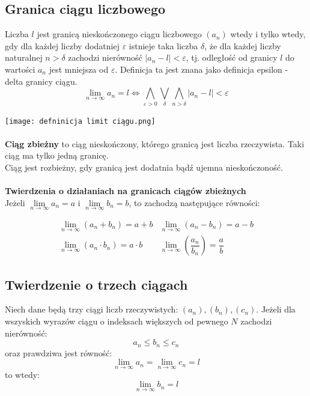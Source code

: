 \documentclass[14pt,a4paper]{extarticle}
\begin{document}
\subsection{Granica ciągu liczbowego}
Liczba $l$ jest granicą nieskończonego ciągu liczbowego $(a_{n})$ wtedy i tylko wtedy, gdy dla
każdej liczby dodatniej $\varepsilon$ istnieje taka liczba $\delta$, że dla każdej liczby naturalnej
$n > \delta$ zachodzi nierówność $\vert a_{n} - l\vert < \varepsilon$, tj. odległość od granicy $l$ do
wartości $a_{n}$ jest mniejsza od $\varepsilon$. Definicja ta jest znana jako definicja epsilon - delta granicy ciągu.\\
$$\lim_{n\to \infty}a_{n} = l \Leftrightarrow \underset{\varepsilon > 0}{\bigwedge} \underset{\delta}{\bigvee} \underset{n > \delta}{\bigwedge} \vert a_{n} - l\vert < \varepsilon$$

\noindent\texttt{[image: defninicja limit ciągu.png]}\\\\
\noindent\textbf{Ciąg zbieżny} to ciąg nieskończony, którego granicą jest liczba rzeczywista.
Taki ciąg ma tylko jedną granicę.\\
Ciąg jest rozbieżny, gdy granicą jest dodatnia bądź ujemna nieskończoność.\\\\

\noindent\textbf{Twierdzenia o działaniach na granicach ciągów zbieżnych}\\
Jeżeli $\underset{n \to \infty}{\lim}a_{n} = a$ i $\underset{n \to \infty}{\lim}b_{n} = b$, to zachodzą następujące równości:
{%

\renewcommand{\arraycolsep}{1cm}
\renewcommand{\arraystretch}{1.8}

\begin{equation*}
\begin{array}{cc}
   \underset{n \to \infty}{\lim}(a_{n} + b_{n}) = a + b & \underset{n \to \infty}{\lim}(a_{n} - b_{n}) = a - b\\
   \underset{n \to \infty}{\lim}(a_{n}\cdot b_{n}) = a\cdot b & \underset{n \to \infty}{\lim}\left(\dfrac{a_{n}}{b_{n}}\right) = \dfrac{a}{b}
\end{array}
\end{equation*}
}%

\newpage
\subsection{Twierdzenie o trzech ciągach}
\noindent Niech dane będą trzy ciągi liczb rzeczywistych: $(a_{n}), (b_{n}), (c_{n})$. Jeżeli dla wszyskich
wyrazów ciągu o indeksach większych od pewnego $N$ zachodzi nierówność:
\[a_{n} \leq b_{n} \leq c_{n}\]
\noindent oraz prawdziwa jest równość:
\[\lim_{n \to \infty} a_{n} = \lim_{n \to \infty} c_{n} = l\]
to wtedy:
\[\lim_{n \to \infty} b_{n} = l\]
\end{document}

